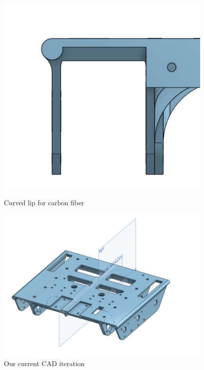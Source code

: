 \begin{figure}[ht]
\centering
\begin{minipage}[b]{.48\textwidth}
  \centering
  \includegraphics[width=0.95\textwidth]{Meetings/October/10-18-21/10-18-21_CAD_Figure3 - Nathan Forrer.PNG}
  \caption{Curved lip for carbon fiber}
  \label{fig:101821_3}
\end{minipage}%
\hfill%
\begin{minipage}[b]{.48\textwidth}
  \centering
  \includegraphics[width=0.95\textwidth]{Meetings/October/10-18-21/10-18-21_CAD_Figure4 - Nathan Forrer.PNG}
  \caption{Our current CAD iteration}
  \label{fig:101821_4}
\end{minipage}
\end{figure}




